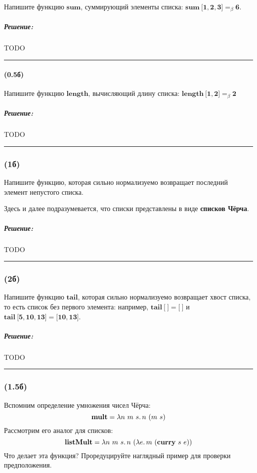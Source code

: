 \documentclass{article}
\newenvironment{proof}{\subparagraph{\hspace{-1em}Решение:\newline}}{\par\noindent\rule{\textwidth}{0.4pt}}
\newcommand{\term}[1]{\mathbf{#1}}
\newcommand{\ap}{~}
\newcommand{\eqbeta}{=_\beta}
\newcommand{\tlist}[1]{\term{[}#1\term{]}} %
\begin{document}
    Напишите функцию $\term{sum}$, суммирующий элементы списка: $\term{sum} \ap \tlist{\term{1}, \term{2}, \term{3}} \eqbeta \term{6}$.

    \begin{proof}
        TODO %
    \end{proof}

    \paragraph{(0.5б)}

    Напишите функцию $\term{length}$, вычисляющий длину списка: $\term{length} \ap \tlist{\term{1}, \term{2}} \eqbeta \term{2}$

    \begin{proof}
        TODO %
    \end{proof}

    \subsubsection{(1б)}

    Напишите функцию, которая сильно нормализуемо возвращает последний элемент непустого списка.

    Здесь и далее подразумевается, что списки представлены в виде \textbf{списков Чёрча}.

    \begin{proof}
        TODO %
    \end{proof}

    \subsubsection{(2б)}

    Напишите функцию $\term{tail}$, которая сильно нормализуемо возвращает хвост списка, то есть список без первого элемента: например, $\term{tail}~\tlist{~} = \tlist{~}$ и $\term{tail}~\tlist{\term{5},\term{10},\term{13}} = \tlist{\term{10}, \term{13}}$.

    \begin{proof}
        TODO %
    \end{proof}

    \subsubsection{(1.5б)}

    Вспомним определение умножения чисел Чёрча:
    \[\term{mult} = \lambda n~m~s\ldotp n~(m~s)\]
    Рассмотрим его аналог для списков:
    \[\term{listMult} = \lambda n~m~s\ldotp n~(\lambda e\ldotp m~(\term{curry}~s~e))\]
    Что делает эта функция?
    Проредуцируйте наглядный пример для проверки предположения.
\end{document}
